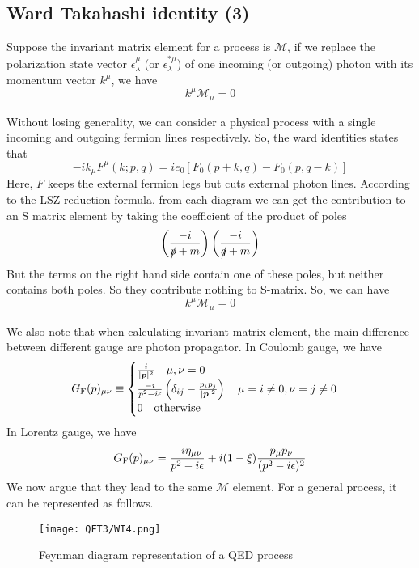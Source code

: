\subsection{Ward Takahashi identity (3)}
Suppose the invariant matrix element for a process is $\mathcal{M}$, if we replace the polarization state vector $\epsilon_{\lambda}^{\mu}$ (or $\epsilon_{\lambda}^{*\mu}$) of one incoming (or outgoing) photon with its momentum vector $k^{\mu}$, we have
\[k^{\mu} \mathcal{M}_{\mu} = 0\]
\begin{newproof}
Without losing generality, we can consider a physical process with a single incoming and outgoing fermion lines respectively. So, the ward identities states that
\[-ik_{\mu} F^{\mu}(k;p,q) = ie_0\left[F_0(p+k,q)-F_0(p,q-k)\right]\]
Here, $F$ keeps the external fermion legs but cuts external photon lines. According to the LSZ reduction formula, from each diagram we can get the contribution to an S matrix element by taking the coefficient of the product of poles
\[\left( \frac{-i}{\slashed{p}+m} \right) \left( \frac{-i}{\slashed{q}+m} \right)\] 
But the terms on the right hand side contain one of these poles, but neither contains both poles. So they contribute nothing to S-matrix. 
So, we can have
\[k^{\mu} \mathcal{M}_{\mu} = 0\] 
\end{newproof}

\noindent
We also note that when calculating invariant matrix element, the main difference between different gauge are photon propagator. In Coulomb gauge, we have
\[G_{\rm F}(p)_{\mu\nu} \equiv \begin{cases} \frac{i}{|\bm{p}|^2} \quad \mu,\nu=0\\  \frac{-i}{p^2-i\epsilon} \left(\delta_{ij} - \frac{p_ip_j}{|\bm{p}|^2}\right) \quad \mu = i \neq 0, \nu = j \neq 0 \\ 0 \quad \mbox{otherwise} \end{cases} \]
In Lorentz gauge, we have
\[G_{\rm F}(p)_{\mu\nu}  = \frac{-i\eta_{\mu\nu}}{p^2-i\epsilon} + i(1-\xi)\frac{p_{\mu}p_{\nu}}{(p^2-i\epsilon)^2} \]
We now argue that they lead to the same $\mathcal{M}$ element.
For a general process, it can be represented as follows.

\begin{figure}[!h]
\centering
\texttt{[image: QFT3/WI4.png]}
\caption{Feynman diagram representation of a QED process}
\end{figure}


